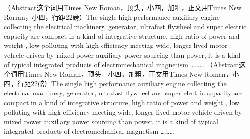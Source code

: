 \begin{abstract}
	（摘要二字使用黑体小四，顶头）。单体高性能辅助发动机是集电机、发电机、超高速飞轮及超级电容于一体的一种结构紧凑、比功率高、污染低、效率高、适应广、寿命长的混合动力车辆辅助动力源，是一种典型的机电磁一体化产品。其研究涉及到机械、材料、电工、电子、热工、计算机等多种学科领域。目前国内外对此均为对单一部件的理论及多部件外部集成结构的研究，并未提出将多种辅助动力能源装置从本质结构与自适应控制上实现一体化集成设计的概念，本论文则提出了单体高性能辅助发动机这一独立装置，并进行了初步的研发，主要就高速飞轮、盘式同步永磁电机和发电机集成的具体功能实现与整体结构作了理论分析计算与设计。重点对盘式永磁电机的分析计算、飞轮的计算及整体实现作了较深入研究，最后对该装置与车辆其他装置的对接与控制策略作了初步……（内容宋体，小四，行距固定值22磅，200字左右，）。
	（摘要二字使用黑体小四，顶头）。单体高性能辅助发动机是集电机、发电机、超高速飞轮及超级电容于一体的一种结构紧凑、比功率高、污染低、效率高、适应广、寿命长的混合动力车辆辅助动力源，是一种典型的机电磁一体化产品。其研究涉及到机械、材料、电工、电子、热工、计算机等多种学科领域。目前国内外对此均为对单一部件的理论及多部件外部集成结构的研究，并未提出将多种辅助动力能源装置从本质结构与自适应控制上实现一体化集成设计的概念，本论文则提出了单体高性能辅助发动机这一独立装置，并进行了初步的研发，主要就高速飞轮、盘式同步永磁电机和发电机集成的具体功能实现与整体结构作了理论分析计算与设计。重点对盘式永磁电机的分析计算、飞轮的计算及整体实现作了较深入研究，最后对该装置与车辆其他装置的对接与控制策略作了初步……（内容宋体，小四，行距固定值22磅，200字左右，）。
\end{abstract}

\begin{enabstract}
	（Abstract这个词用Times New Roman，顶头，小四，加粗，正文用Times New Roman，小四，行距22磅）The single high performance auxiliary engine collecting the electrical machinery, generator, ultrafast flywheel and super electric capacity are compact in a kind of integrative structure, high ratio of power and weight , low polluting with high efficiency meeting wide, longer-lived motor vehicle driven by mixed power auxiliary power sourcing than power, it is a kind of typical integrated products of electromechanical magnetism ………
	（Abstract这个词用Times New Roman，顶头，小四，加粗，正文用Times New Roman，小四，行距22磅）The single high performance auxiliary engine collecting the electrical machinery, generator, ultrafast flywheel and super electric capacity are compact in a kind of integrative structure, high ratio of power and weight , low polluting with high efficiency meeting wide, longer-lived motor vehicle driven by mixed power auxiliary power sourcing than power, it is a kind of typical integrated products of electromechanical magnetism ………
\end{enabstract}